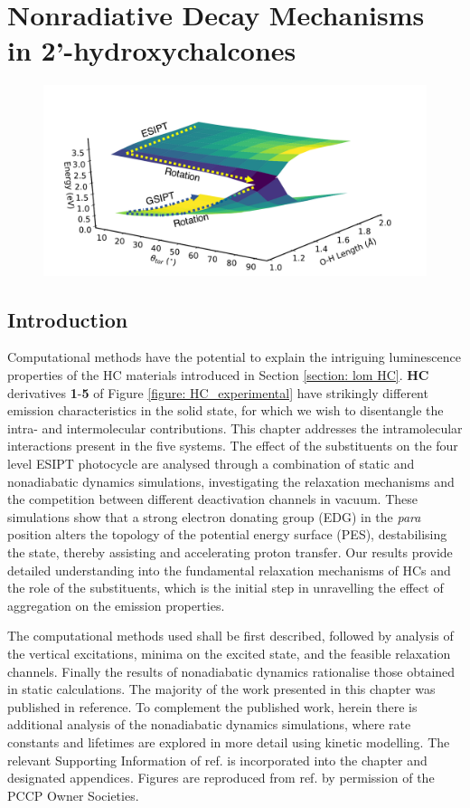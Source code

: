 \chapter[Nonradiative Decay Mechanisms in 2'-hydroxychalcones]{Nonradiative Decay Mechanisms\\ in 2'-hydroxychalcones}
\label{chapter:NRdecay}
\begin{figure}[H]
\centering
  \includegraphics[width=0.7\linewidth]{3nonradiativedecay/1toc.pdf}
\end{figure}
\section{Introduction}\label{section: NRdecay_intro}
Computational methods have the potential to explain the intriguing luminescence properties of the \acf{HC} materials introduced in Section \ref{section: lom HC}. \textbf{HC} derivatives \textbf{1}-\textbf{5} of Figure \ref{figure: HC_experimental} have strikingly different emission characteristics in the solid state, for which we wish to disentangle the intra- and intermolecular contributions. This chapter addresses the intramolecular interactions present in the five systems. The effect of the substituents on the four level \ac{ESIPT} photocycle are analysed through a combination of static and nonadiabatic dynamics simulations, investigating the relaxation mechanisms and the competition between different deactivation channels in vacuum. These simulations show that a strong electron donating group (EDG) in the \textit{para} position alters the topology of the potential energy surface (PES), destabilising the \Estar{} state, thereby assisting and accelerating proton transfer. Our results provide detailed understanding into the fundamental relaxation mechanisms of \ac{HC}s and the role of the substituents, which is the initial step in unravelling the effect of aggregation on the emission properties.

The computational methods used shall be first described, followed by analysis of the vertical excitations, minima on the excited state, and the feasible relaxation channels. Finally the results of nonadiabatic dynamics rationalise those obtained in static calculations. The majority of the work presented in this chapter was published in reference. To complement the published work, herein there is additional analysis of the nonadiabatic dynamics simulations, where rate constants and lifetimes are explored in more detail using kinetic modelling.  The relevant Supporting Information of ref. is incorporated into the chapter and designated appendices. Figures are reproduced from ref. by permission of the PCCP Owner Societies.

